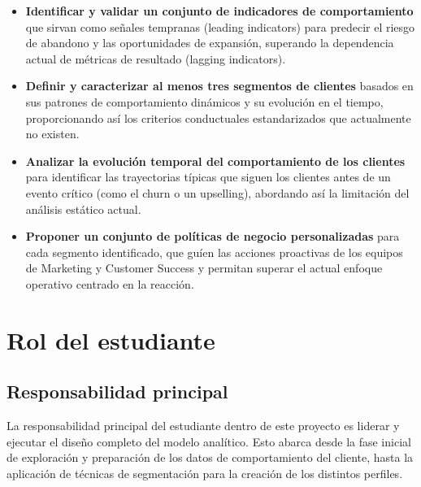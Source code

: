 \begin{itemize}
    \item \textbf{Identificar y validar un conjunto de indicadores de comportamiento} que sirvan como señales tempranas (leading indicators) para predecir el riesgo de abandono y las oportunidades de expansión, superando la dependencia actual de métricas de resultado (lagging indicators).

    \item \textbf{Definir y caracterizar al menos tres segmentos de clientes} basados en sus patrones de comportamiento dinámicos y su evolución en el tiempo, proporcionando así los criterios conductuales estandarizados que actualmente no existen.

    \item \textbf{Analizar la evolución temporal del comportamiento de los clientes} para identificar las trayectorias típicas que siguen los clientes antes de un evento crítico (como el churn o un upselling), abordando así la limitación del análisis estático actual.
    
    \item \textbf{Proponer un conjunto de políticas de negocio personalizadas} para cada segmento identificado, que guíen las acciones proactivas de los equipos de Marketing y Customer Success y permitan superar el actual enfoque operativo centrado en la reacción.
\end{itemize}

\newpage

\section{Rol del estudiante}
\subsection{Responsabilidad principal}

La responsabilidad principal del estudiante dentro de este proyecto es liderar y ejecutar el diseño completo del modelo analítico. Esto abarca desde la fase inicial de exploración y preparación de los datos de comportamiento del cliente, hasta la aplicación de técnicas de segmentación para la creación de los distintos perfiles. \\


